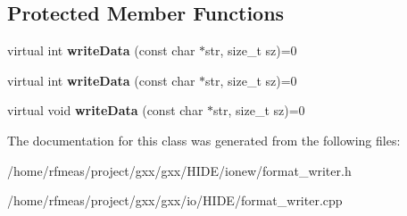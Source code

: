 \subsection*{Protected Member Functions}
\begin{DoxyCompactItemize}
\item 
virtual int {\bfseries write\+Data} (const char $\ast$str, size\+\_\+t sz)=0\hypertarget{classgxx_1_1io_1_1format__writer_aac2244683e7925a1852a2f55ddb14ed4}{}\label{classgxx_1_1io_1_1format__writer_aac2244683e7925a1852a2f55ddb14ed4}

\item 
virtual int {\bfseries write\+Data} (const char $\ast$str, size\+\_\+t sz)=0\hypertarget{classgxx_1_1io_1_1format__writer_aac2244683e7925a1852a2f55ddb14ed4}{}\label{classgxx_1_1io_1_1format__writer_aac2244683e7925a1852a2f55ddb14ed4}

\item 
virtual void {\bfseries write\+Data} (const char $\ast$str, size\+\_\+t sz)=0\hypertarget{classgxx_1_1io_1_1format__writer_a15b0eaad39e0be8ccff9dc734a101377}{}\label{classgxx_1_1io_1_1format__writer_a15b0eaad39e0be8ccff9dc734a101377}

\end{DoxyCompactItemize}


The documentation for this class was generated from the following files\+:\begin{DoxyCompactItemize}
\item 
/home/rfmeas/project/gxx/gxx/\+H\+I\+D\+E/ionew/format\+\_\+writer.\+h\item 
/home/rfmeas/project/gxx/gxx/io/\+H\+I\+D\+E/format\+\_\+writer.\+cpp\end{DoxyCompactItemize}
